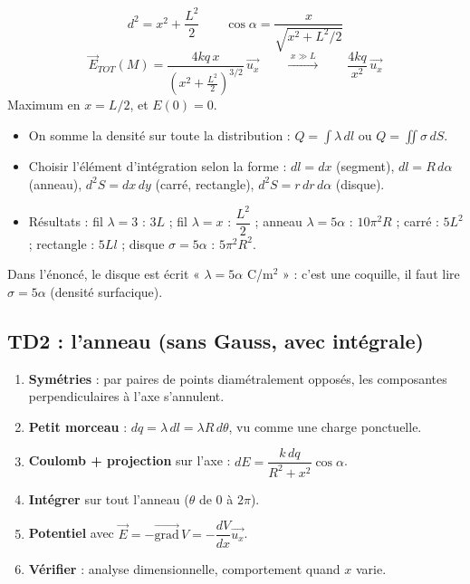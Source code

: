 \documentclass[11pt,a4paper]{article}
\newcommand{\vect}[1]{\overrightarrow{#1}}
\newcommand{\ux}{\vect{u_x}}
\newcommand{\E}{\vect{E}}
\begin{document}
\begin{formule}
\[
d^2=x^2+\frac{L^2}{2}
\qquad
\cos\alpha=\frac{x}{\sqrt{x^2+L^2/2}}
\]
\[
\E_{TOT}(M)=\frac{4kq\,x}{\left(x^2+\frac{L^2}{2}\right)^{3/2}}\,\ux
\qquad
\xrightarrow{\;x\gg L\;}\qquad
\frac{4kq}{x^2}\,\ux
\]
Maximum en $x=L/2$, et $E(0)=0$.
\end{formule}

\begin{methode}
\begin{itemize}[leftmargin=1.5em]
  \item On somme la densité sur toute la distribution : $Q=\displaystyle\int\lambda\,dl$ ou $Q=\displaystyle\iint\sigma\,dS$.
  \item Choisir l'élément d'intégration selon la forme : $dl=dx$ (segment), $dl=R\,d\alpha$ (anneau), $d^2S=dx\,dy$ (carré, rectangle), $d^2S=r\,dr\,d\alpha$ (disque).
  \item Résultats : fil $\lambda=3$ : $3L$ ; fil $\lambda=x$ : $\dfrac{L^2}{2}$ ; anneau $\lambda=5\alpha$ : $10\pi^2R$ ; carré : $5L^2$ ; rectangle : $5Ll$ ; disque $\sigma=5\alpha$ : $5\pi^2R^2$.
\end{itemize}
Dans l'énoncé, le disque est écrit « $\lambda=5\alpha$ C/m$^2$ » : c'est une coquille, il faut lire $\sigma=5\alpha$ (densité surfacique).
\end{methode}

\subsection{TD2 : l'anneau (sans Gauss, avec intégrale)}

\begin{methode}
\begin{enumerate}[leftmargin=1.5em]
  \item \textbf{Symétries} : par paires de points diamétralement opposés, les composantes perpendiculaires à l'axe s'annulent.
  \item \textbf{Petit morceau} : $dq=\lambda\,dl=\lambda R\,d\theta$, vu comme une charge ponctuelle.
  \item \textbf{Coulomb + projection} sur l'axe : $dE=\dfrac{k\,dq}{R^2+x^2}\cos\alpha$.
  \item \textbf{Intégrer} sur tout l'anneau ($\theta$ de $0$ à $2\pi$).
  \item \textbf{Potentiel} avec $\E=-\overrightarrow{\mathrm{grad}}\,V=-\dfrac{dV}{dx}\ux$.
  \item \textbf{Vérifier} : analyse dimensionnelle, comportement quand $x$ varie.
\end{enumerate}
\end{methode}
\end{document}
